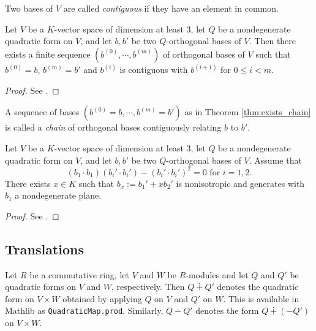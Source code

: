 \begin{definition}\label{def:contiguous}
\leanok
Two bases of $V$ are called \emph{contiguous} if they have an element in common.
\end{definition}

\begin{theorem}\label{thm:exists_chain}
\leanok
Let $V$ be a $K$-vector space of dimension at least $3$, let $Q$ be a nondegenerate quadratic form on $V$, and let $b, b'$ be two $Q$-orthogonal bases of $V$. Then there exists a finite sequence $(b^{(0)}, \cdots, b^{(m)})$ of orthogonal bases of $V$ such that $b^{(0)} = b$, $b^{(m)} = b'$ and $b^{(i)}$ is contiguous with $b^{(i + 1)}$ for $0 \le i < m$.
\end{theorem}

\begin{proof}
See \cite[\S IV.1.4, Theorem 2]{Ser73}.
\end{proof}

\begin{definition}\label{def:chain}
\leanok
A sequence of bases $(b^{(0)} = b, \cdots, b^{(m)} = b')$ as in Theorem \ref{thm:exists_chain} is called a \emph{chain} of orthogonal bases contiguously relating $b$ to $b'$.
\end{definition}

\begin{lemma}\label{lem:exists_const}
\leanok
Let $V$ be a $K$-vector space of dimension at least $3$, let $Q$ be a nondegenerate quadratic form on $V$, and let $b, b'$ be two $Q$-orthogonal bases of $V$. Assume that 
\[ (b_1 \cdot b_1)(b_i' \cdot b_i') - (b_i' \cdot b_i')^2 = 0 \text{ for } i = 1, 2. \]
There exists $x \in K$ such that $b_x := b_1' + x b_2'$ is nonisotropic and generates with $b_1$ a nondegenerate plane.
\end{lemma}

\begin{proof}
	See \cite[\S IV.1.4, Lemma after Theorem 2]{Ser73}.
\end{proof}

\subsection{Translations}\label{subsec:translations}

Let $R$ be a commutative ring, let $V$ and $W$ be $R$-modules and let $Q$ and $Q'$ be quadratic forms on $V$ and $W$, respectively. Then $Q \dotplus Q'$ denotes the quadratic form on $V \times W$ obtained by applying $Q$ on $V$ and $Q'$ on $W$. This is available in Mathlib as \texttt{QuadraticMap.prod}. Similarly, $Q \dotminus Q'$ denotes the form $Q \dotplus (-Q')$ on $V \times W$.

